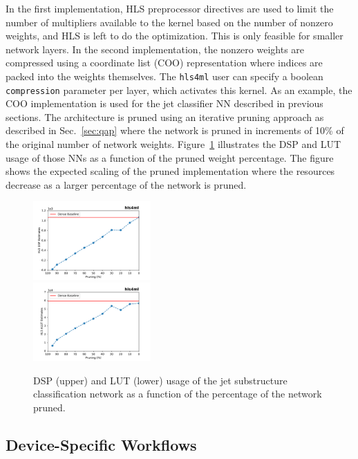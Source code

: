 \documentclass[sigconf]{acmart}
\newcommand{\hlsfml}{\texttt{hls4ml}\xspace}
\begin{document}
In the first implementation, HLS preprocessor directives are used to limit the number of multipliers available to the kernel based on the number of nonzero weights, and HLS is left to do the optimization.  
This is only feasible for smaller network layers.  
In the second implementation, the nonzero weights are compressed using a coordinate list (COO) representation where indices are packed into the weights themselves. 
The \hlsfml user can specify a boolean \texttt{compression} parameter per layer, which activates this kernel. 
As an example, the COO implementation is used for the jet classifier NN described in previous sections. 
The architecture is pruned using an iterative pruning approach as described in Sec.~\ref{sec:qap} where the network is pruned in increments of 10\% of the original number of network weights. 
Figure~\ref{fig:sparse} illustrates the DSP and LUT usage of those NNs as a function of the pruned weight percentage.
The figure shows the expected scaling of the pruned implementation where the resources decrease as a larger percentage of the network is pruned. 

\begin{figure}[t!]
\centering
\includegraphics[width=0.40\textwidth]{Figs/pr_scan_dsp_histogram.pdf} \\
\includegraphics[width=0.40\textwidth]{Figs/pr_scan_lut_histogram.pdf}
\caption{DSP (upper) and LUT (lower) usage of the jet substructure classification network as a function of the percentage of the network pruned.}
\label{fig:sparse}
\end{figure}

\subsection{Device-Specific Workflows}
\end{document}
